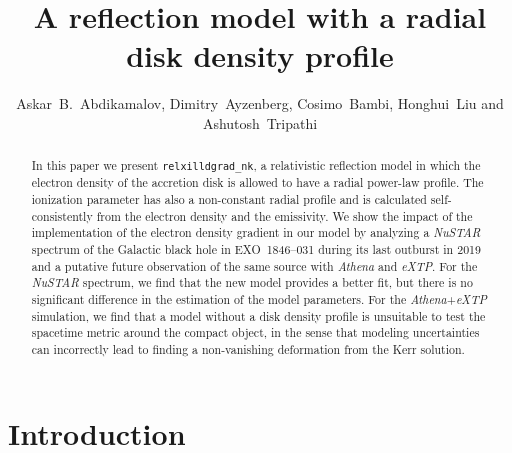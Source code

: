 \documentclass[twocolumn]{emulateapj}
\begin{document}
\title{A reflection model with a radial disk density profile}





\author{Askar~B.~Abdikamalov, Dimitry~Ayzenberg, Cosimo~Bambi, Honghui~Liu and Ashutosh~Tripathi}






\begin{abstract}
In this paper we present {\tt relxilldgrad\_nk}, a relativistic reflection model in which the electron density of the accretion disk is allowed to have a radial power-law profile. The ionization parameter has also a non-constant radial profile and is calculated self-consistently from the electron density and the emissivity. We show the impact of the implementation of the electron density gradient in our model by analyzing a \textsl{NuSTAR} spectrum of the Galactic black hole in EXO~1846--031 during its last outburst in 2019 and a putative future observation of the same source with \textsl{Athena} and \textsl{eXTP}. For the \textsl{NuSTAR} spectrum, we find that the new model provides a better fit, but there is no significant difference in the estimation of the model parameters. For the \textsl{Athena}+\textsl{eXTP} simulation, we find that a model without a disk density profile is unsuitable to test the spacetime metric around the compact object, in the sense that modeling uncertainties can incorrectly lead to finding a non-vanishing deformation from the Kerr solution.
\end{abstract}










\section{Introduction}
\end{document}
